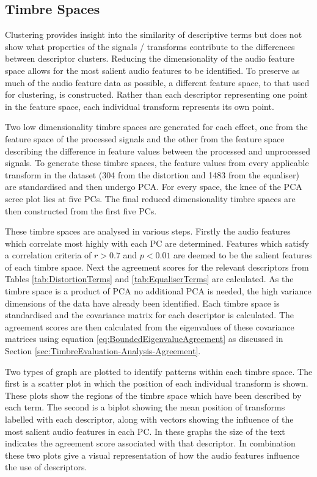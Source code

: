 	\subsection{Timbre Spaces}
	\label{sec:TimbreEvaluation-Analysis-TimbreSpaces}
		Clustering provides insight into the similarity of descriptive terms but does not show what properties of
		the signals / transforms contribute to the differences between descriptor clusters. Reducing the
		dimensionality of the audio feature space allows for the most salient audio features to be identified. To
		preserve as much of the audio feature data as possible, a different feature space, to that used for
		clustering, is constructed. Rather than each descriptor representing one point in the feature space, each
		individual transform represents its own point. 

		Two low dimensionality timbre spaces are generated for each effect, one from the feature space of the
		processed signals and the other from the feature space describing the difference in feature values between
		the processed and unprocessed signals. To generate these timbre spaces, the feature values from every
		applicable transform in the dataset (304 from the distortion and 1483 from the equaliser) are standardised
		and then undergo PCA. For every space, the knee of the PCA scree plot lies at five PCs. The final reduced
		dimensionality timbre spaces are then constructed from the first five PCs.

		These timbre spaces are analysed in various steps. Firstly the audio features which correlate most highly
		with each PC are determined. Features which satisfy a correlation criteria of $r > 0.7$ and $p < 0.01$ are
		deemed to be the salient features of each timbre space. Next the agreement scores for the relevant
		descriptors from Tables \ref{tab:DistortionTerms} and \ref{tab:EqualiserTerms} are calculated. As the
		timbre space is a product of PCA no additional PCA is needed, the high variance dimensions of the data have
		already been identified. Each timbre space is standardised and the covariance matrix for each descriptor is
		calculated. The agreement scores are then calculated from the eigenvalues of these covariance matrices
		using equation \ref{eq:BoundedEigenvalueAgreement} as discussed in Section
		\ref{sec:TimbreEvaluation-Analysis-Agreement}.
		
		Two types of graph are plotted to identify patterns within each timbre space. The first is a scatter plot
		in which the position of each individual transform is shown. These plots show the regions of the timbre
		space which have been described by each term. The second is a biplot showing the mean position of
		transforms labelled with each descriptor, along with vectors showing the influence of the most salient
		audio features in each PC. In these graphs the size of the text indicates the agreement score associated
		with that descriptor. In combination these two plots give a visual representation of how the audio features
		influence the use of descriptors.

